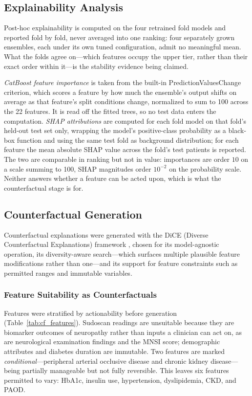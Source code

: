 \documentclass[pdflatex,sn-mathphys-num]{sn-jnl}%
\theoremstyle{thmstyleone}%
\theoremstyle{thmstyletwo}%
\theoremstyle{thmstylethree}%
\begin{document}
\subsection{Explainability Analysis}
\label{sec:explainability}

Post-hoc explainability is computed on the four retrained fold models and reported fold by fold,
never averaged into one ranking: four separately grown ensembles, each under its own tuned
configuration, admit no meaningful mean. What the folds agree on---which features occupy the upper
tier, rather than their exact order within it---is the stability evidence being claimed.

\textit{CatBoost feature importance} is taken from the built-in PredictionValuesChange criterion,
which scores a feature by how much the ensemble's output shifts on average as that feature's split
conditions change, normalized to sum to 100 across the 22 features. It is read off the fitted trees,
so no test data enters the computation. \textit{SHAP attributions} are computed for each fold model
on that fold's held-out test set only, wrapping the model's positive-class probability as a
black-box function and using the same test fold as background distribution; for each feature the
mean absolute SHAP value across the fold's test patients is reported. The two are comparable in
ranking but not in value: importances are order $10$ on a scale summing to 100, SHAP magnitudes
order $10^{-2}$ on the probability scale. Neither answers whether a feature can be acted upon, which
is what the counterfactual stage is for.

\subsection{Counterfactual Generation}

Counterfactual explanations were generated with the DiCE (Diverse Counterfactual Explanations)
framework \cite{mothilal2020explaining}, chosen for its model-agnostic operation, its
diversity-aware search---which surfaces multiple plausible feature modifications rather than one---and
its support for feature constraints such as permitted ranges and immutable variables.

\subsubsection{Feature Suitability as Counterfactuals}
Features were stratified by actionability before generation (Table~\ref{tab:cf_features}). Sudoscan
readings are unsuitable because they are biomarker outcomes of neuropathy rather than inputs a
clinician can act on, as are neurological examination findings and the MNSI score; demographic
attributes and diabetes duration are immutable. Two features are marked \textit{conditional}---peripheral
arterial occlusive disease and chronic kidney disease---being partially manageable but
not fully reversible. This leaves six features permitted to vary: HbA1c, insulin use, hypertension,
dyslipidemia, CKD, and PAOD.
\end{document}
